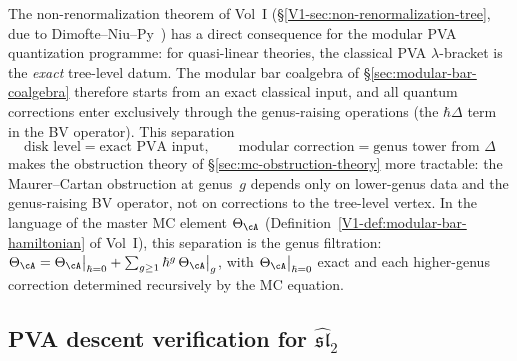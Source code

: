 \begin{remark}
\label{rem:pva-non-renormalization}
The non-renormalization theorem of Vol~I
(\S\ref*{V1-sec:non-renormalization-tree}, due to
Dimofte--Niu--Py~\cite{DNP2025}) has a direct consequence for the
modular PVA quantization programme: for quasi-linear theories, the
classical PVA $\lambda$-bracket is the \emph{exact} tree-level datum.
The modular bar coalgebra of
\S\ref*{sec:modular-bar-coalgebra} therefore starts from an exact
classical input, and all quantum corrections enter exclusively
through the genus-raising operations (the $\hbar\Delta$ term in the
BV operator). This separation
\[
 \text{disk level} = \text{exact PVA input},
 \qquad
 \text{modular correction} = \text{genus tower from $\Delta$}
\]
makes the obstruction theory of
\S\ref*{sec:mc-obstruction-theory} more tractable:
the Maurer--Cartan obstruction at genus~$g$ depends only on
lower-genus data and the genus-raising BV operator, not on corrections
to the tree-level vertex. In the language of the master MC element
$\Theta_{\cA}$ (Definition~\ref*{V1-def:modular-bar-hamiltonian} of
Vol~I), this separation is the genus filtration:
$\Theta_{\cA} = \Theta_{\cA}\big|_{\hbar=0} +
\sum_{g \geq 1} \hbar^g\,\Theta_{\cA}\big|_{g}$, with
$\Theta_{\cA}\big|_{\hbar=0}$ exact and each higher-genus correction
determined recursively by the MC equation.
\end{remark}

\subsection{PVA descent verification for
$\widehat{\mathfrak{sl}}_2$}
\label{subsec:pva-descent-sl2}

